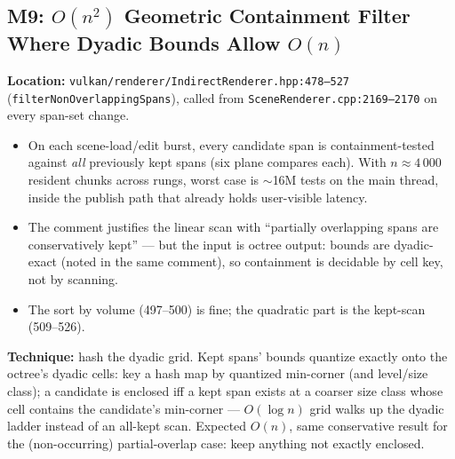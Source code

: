 \documentclass[11pt,a4paper]{article}
\begin{document}
\subsection{M9: $O(n^2)$ Geometric Containment Filter Where Dyadic Bounds Allow $O(n)$}

\textbf{Location:} \texttt{vulkan/renderer/IndirectRenderer.hpp:478--527} (\texttt{filterNonOverlappingSpans}), called from \texttt{SceneRenderer.cpp:2169--2170} on every span-set change.

\begin{itemize}
    \item On each scene-load/edit burst, every candidate span is containment-tested against \emph{all} previously kept spans (six plane compares each). With $n \approx 4\,000$ resident chunks across rungs, worst case is $\sim$16M tests on the main thread, inside the publish path that already holds user-visible latency.
    \item The comment justifies the linear scan with ``partially overlapping spans are conservatively kept'' --- but the input is octree output: bounds are dyadic-exact (noted in the same comment), so containment is decidable by cell key, not by scanning.
    \item The sort by volume (497--500) is fine; the quadratic part is the kept-scan (509--526).
\end{itemize}

\textbf{Technique:} hash the dyadic grid. Kept spans' bounds quantize exactly onto the octree's dyadic cells: key a hash map by quantized min-corner (and level/size class); a candidate is enclosed iff a kept span exists at a coarser size class whose cell contains the candidate's min-corner --- $O(\log n)$ grid walks up the dyadic ladder instead of an all-kept scan. Expected $O(n)$, same conservative result for the (non-occurring) partial-overlap case: keep anything not exactly enclosed.
\end{document}
